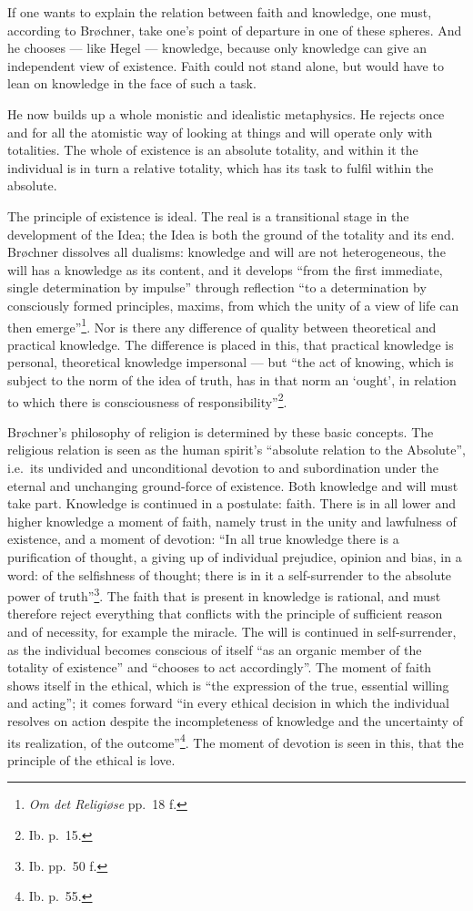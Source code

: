 \documentclass[12pt,a4paper,openany]{book}
\newcommand{\opage}[1]{\marginnote{\footnotesize\textit{[#1]}}}
\begin{document}
If one wants to explain the relation between faith and knowledge, one must, according to Brøchner, take one's
point of departure in one of these spheres. And he chooses --- like Hegel --- knowledge, because only knowledge can
give an independent view of existence. Faith could not stand alone, but would have to lean on knowledge in the
face of such a task.

He now builds up a whole monistic and idealistic metaphysics. He rejects once and for all the atomistic way of
looking at things and will operate only with totalities. The whole of existence is an absolute totality, and within
it the individual is in turn a relative totality, which has its task to fulfil within the absolute.

The principle of existence is ideal. The real is a transitional stage in the development of the Idea; the Idea is
both the ground of the totality and its end. Brøchner dissolves all dualisms: knowledge and will are not
heterogeneous, the will has a knowledge as its content, and it develops ``from the first immediate, single
determination by impulse'' through reflection ``to a determination by consciously formed principles, maxims, from
which the unity of a view of life can then
emerge''\footnote{\textit{Om det Religiøse} pp.~18 f.}. Nor is there any difference of quality between
theoretical and practical knowledge. The difference is placed in this, that practical knowledge is personal,
theoretical knowledge impersonal --- but ``the act of knowing, which is subject to the norm of the idea of truth,
has in that norm an `ought', in relation to which there is consciousness of
responsibility''\footnote{Ib. p.~15.}.

Brøchner's philosophy of religion is determined by these basic concepts. The religious relation is seen as the
human spirit's ``absolute relation to the Absolute'', i.e.\ its undivided and unconditional devotion to and
subordination under the eternal and unchanging ground-force of existence. Both knowledge and will must take part.
Knowledge is continued in a postulate: faith. There is in all lower and higher knowledge a moment of faith, namely
trust in the unity and lawfulness of existence, and a moment of devotion: ``In all true knowledge there is a
purification of thought, a giving up of individual prejudice, opinion and bias, in a word: of the selfishness
\opage{155}\setcounter{footnote}{0}%
of thought; there is in it a self-surrender to the absolute power of truth''\footnote{Ib. pp.~50 f.}.
The faith that is present in knowledge is rational, and must therefore reject everything that conflicts with the
principle of sufficient reason and of necessity, for example the miracle. The will is continued in self-surrender,
as the individual becomes conscious of itself ``as an organic member of the totality of existence'' and ``chooses to
act accordingly''. The moment of faith shows itself in the ethical, which is ``the expression of the true,
essential willing and acting''; it comes forward ``in every ethical decision in which the individual resolves on
action despite the incompleteness of knowledge and the uncertainty of its realization, of the
outcome''\footnote{Ib. p.~55.}. The moment of devotion is seen in this, that the principle of the ethical is love.
\end{document}
